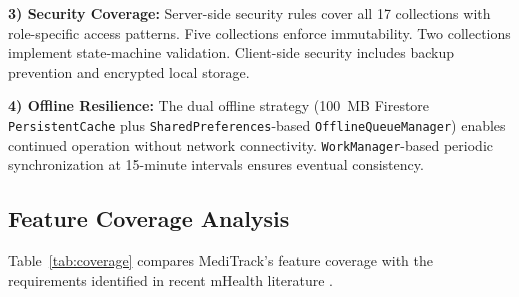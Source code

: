 \documentclass[journal,onecolumn,web]{ieeecolor}
\begin{document}
{\bf 3) Security Coverage:} Server-side security
rules cover all 17 collections with role-specific
access patterns. Five collections enforce
immutability. Two collections implement
state-machine validation. Client-side security
includes backup prevention and encrypted local
storage.

{\bf 4) Offline Resilience:} The dual offline
strategy (100~MB Firestore {\tt PersistentCache}
plus {\tt SharedPreferences}-based
{\tt OfflineQueueManager}) enables continued
operation without network connectivity.
{\tt WorkManager}-based periodic synchronization at
15-minute intervals ensures eventual consistency.

\subsection{Feature Coverage Analysis}
Table~\ref{tab:coverage} compares MediTrack's feature
coverage with the requirements identified in recent
mHealth literature
\cite{free2013, batista2020}.
\end{document}
